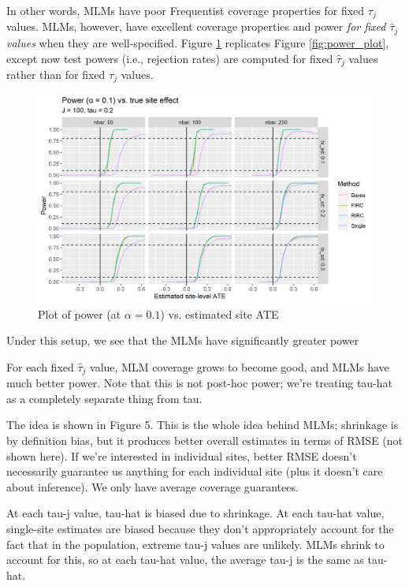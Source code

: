 \documentclass[]{article}
\begin{document}
In other words, MLMs have poor Frequentist coverage properties for fixed $\tau_j$ values.
MLMs, however, have excellent coverage properties and power \textit{for fixed $\hat{\tau}_j$ values} when they are well-specified.
Figure \ref{fig:power_plot_cond} replicates Figure \ref{fig:power_plot}, except now test powers (i.e., rejection rates) are computed for fixed $\hat{\tau}_j$ values rather than for fixed $\tau_j$ values.
\begin{figure}[ht]
	\centering
	\includegraphics[width=\textwidth]{cond_power_1sided}
	\caption{Plot of power (at $\alpha = 0.1$) vs. estimated site ATE}
	\label{fig:power_plot_cond}
\end{figure}

Under this setup, we see that the MLMs have significantly greater power 

For each fixed $\hat{\tau}_j$ value, MLM coverage grows to become good, and MLMs have much better power.
Note that this is not post-hoc power; we're treating tau-hat as a completely separate thing from tau.

The idea is shown in Figure 5.
This is the whole idea behind MLMs; shrinkage is by definition bias, but it produces better overall estimates in terms of RMSE (not shown here).
If we're interested in individual sites, better RMSE doesn't necessarily guarantee us anything for each individual site (plus it doesn't care about inference).
We only have average coverage guarantees.

At each tau-j value, tau-hat is biased due to shrinkage.
At each tau-hat value, single-site estimates are biased because they don't appropriately account for the fact that in the population, extreme tau-j values are unlikely.
MLMs shrink to account for this, so at each tau-hat value, the average tau-j is the same as tau-hat.
\end{document}
